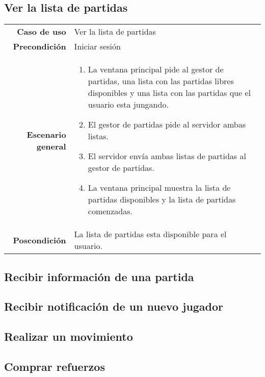 \subsection{Ver la lista de partidas}

{\footnotesize
\begin{tabularx}{0.95\textwidth}{r|X}

\textbf{Caso de uso} & Ver la lista de partidas \\

\textbf{Precondición} & Iniciar sesión \\

\textbf{Escenario general} & \begin{enumerate}
\item La ventana principal pide al gestor de partidas, una lista con las 
partidas libres disponibles y una lista con las partidas que el usuario esta 
jungando.
\item El gestor de partidas pide al servidor ambas listas.
\item El servidor envía ambas listas de partidas al gestor de partidas.
\item La ventana principal muestra la lista de partidas disponibles y la lista 
de partidas comenzadas.

\end{enumerate} \\

\textbf{Poscondición} & La lista de partidas esta disponible para el usuario.

\end{tabularx}
}

\subsection{Recibir información de una partida}

\subsection{Recibir notificación de un nuevo jugador}

\subsection{Realizar un movimiento}

\subsection{Comprar refuerzos}

